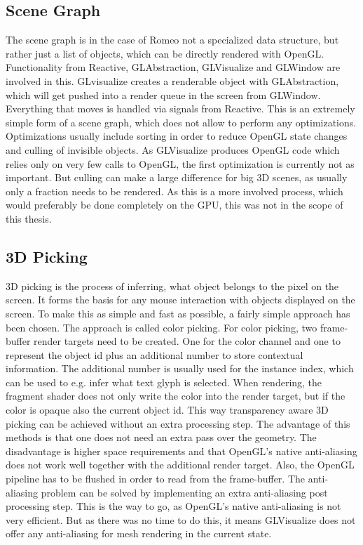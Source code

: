 \subsection{Scene Graph}
The scene graph is in the case of Romeo not a specialized data structure, but rather just a list of objects, which can be directly rendered with OpenGL. Functionality from Reactive, GLAbstraction, GLVisualize and GLWindow are involved in this. GLvisualize creates a renderable object with GLAbstraction, which will get pushed into a render queue in the screen from GLWindow. Everything that moves is handled via signals from Reactive.
This is an extremely simple form of a scene graph, which does not allow to perform any optimizations.
Optimizations usually include sorting in order to reduce OpenGL state changes and culling of invisible objects.
As GLVisualize produces OpenGL code which relies only on very few calls to OpenGL, the first optimization is currently not as important.
But culling can make a large difference for big 3D scenes, as usually only a fraction needs to be rendered.
As this is a more involved process, which would preferably be done completely on the GPU, this was not in the scope of this thesis.

\subsection{3D Picking}

3D picking is the process of inferring, what object belongs to the pixel on the screen. 
It forms the basis for any mouse interaction with objects displayed on the screen.
To make this as simple and fast as possible, a fairly simple approach has been chosen. 
The approach is called color picking.
For color picking, two frame-buffer render targets need to be created. 
One for the color channel and one to represent the object id plus an additional number to store contextual information. The additional number is usually used for the instance index, which can be used to e.g. infer what text glyph is selected.
When rendering, the fragment shader does not only write the color into the render target, but if the color is opaque also the current object id.
This way transparency aware 3D picking can be achieved without an extra processing step. 
The advantage of this methods is that one does not need an extra pass over the geometry. The disadvantage is higher space requirements and that OpenGL's native anti-aliasing does not work well together with the additional render target. Also, the OpenGL pipeline has to be flushed in order to read from the frame-buffer.
The anti-aliasing problem can be solved by implementing an extra anti-aliasing post processing step. This is the way to go, as OpenGL's native anti-aliasing is not very efficient. 
But as there was no time to do this, it means GLVisualize does not offer any anti-aliasing for mesh rendering in the current state.


